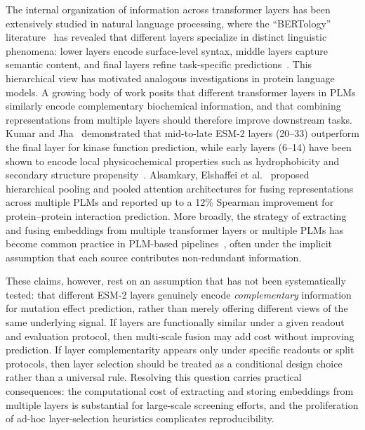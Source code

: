 \documentclass[numbered,webpdf,modern,large]{oup-authoring-template}
\newcommand{\rev}[1]{\textcolor{red}{#1}}
\begin{document}
The internal organization of information across transformer layers has been
extensively studied in natural language processing, where the ``BERTology''
literature~\cite{rogers2021bertology,tenney2019bert} has revealed that different layers specialize
in distinct linguistic phenomena: lower layers encode surface-level syntax, middle
layers capture semantic content, and final layers refine task-specific
predictions~\rev{\cite{tenney2019bert,rogers2021bertology}}.
This hierarchical view has motivated analogous investigations in protein language
models. A growing body of work posits that different transformer layers in PLMs
similarly encode complementary biochemical information, and that combining
representations from multiple layers should therefore improve downstream tasks.
Kumar and Jha~\cite{kumar2025} demonstrated that mid-to-late ESM-2 layers (20--33)
outperform the final layer for kinase function prediction, while early layers
(6--14) have been shown to encode local physicochemical properties such as
hydrophobicity and secondary structure propensity~\cite{detlefsen2022}.
Alsamkary, Elshaffei et al.~\cite{elshaffei2025} proposed hierarchical pooling and
pooled attention architectures for fusing representations across multiple PLMs and
reported up to a 12\% Spearman improvement for protein--protein interaction
prediction. More broadly, the strategy of extracting and fusing embeddings from
multiple transformer layers or multiple PLMs has become common practice in
PLM-based pipelines~\cite{rao2019tape,ko2026fusion,si2024contact}, often under
the implicit assumption that each source contributes non-redundant
information.

These claims, however, rest on an assumption that has not been systematically tested:
that different ESM-2 layers genuinely encode \emph{complementary} information for
mutation effect prediction, rather than merely offering different views of the same
underlying signal. If layers are functionally similar under a given readout and
evaluation protocol, then multi-scale fusion may add cost without improving prediction.
If layer complementarity appears only under specific readouts or split protocols,
then layer selection should be treated as a conditional design choice rather than
a universal rule. Resolving this question carries practical
consequences: the computational cost of extracting and storing embeddings from
multiple layers is substantial for large-scale screening efforts, and the
proliferation of ad-hoc layer-selection heuristics complicates reproducibility.
\end{document}
